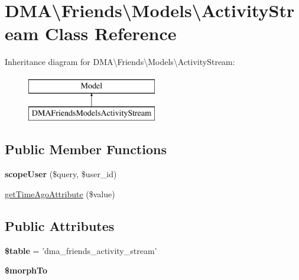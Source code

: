 \hypertarget{classDMA_1_1Friends_1_1Models_1_1ActivityStream}{\section{D\+M\+A\textbackslash{}Friends\textbackslash{}Models\textbackslash{}Activity\+Stream Class Reference}
\label{classDMA_1_1Friends_1_1Models_1_1ActivityStream}
}
Inheritance diagram for D\+M\+A\textbackslash{}Friends\textbackslash{}Models\textbackslash{}Activity\+Stream\+:\begin{figure}[H]
\begin{center}
\leavevmode
\includegraphics[height=2.000000cm]{dc/dae/classDMA_1_1Friends_1_1Models_1_1ActivityStream}
\end{center}
\end{figure}
\subsection*{Public Member Functions}
\begin{DoxyCompactItemize}
\item 
\hypertarget{classDMA_1_1Friends_1_1Models_1_1ActivityStream_ae26f2bdc09d56a8175288479289033d1}{{\bfseries scope\+User} (\$query, \$user\+\_\+id)}\label{classDMA_1_1Friends_1_1Models_1_1ActivityStream_ae26f2bdc09d56a8175288479289033d1}

\item 
\hyperlink{classDMA_1_1Friends_1_1Models_1_1ActivityStream_af1ea76e78f467dbe95233d8a0d2f386b}{get\+Time\+Ago\+Attribute} (\$value)
\end{DoxyCompactItemize}
\subsection*{Public Attributes}
\begin{DoxyCompactItemize}
\item 
\hypertarget{classDMA_1_1Friends_1_1Models_1_1ActivityStream_acc9fdaa6e30c75159bd96d96f6ca5da2}{{\bfseries \$table} = 'dma\+\_\+friends\+\_\+activity\+\_\+stream'}\label{classDMA_1_1Friends_1_1Models_1_1ActivityStream_acc9fdaa6e30c75159bd96d96f6ca5da2}

\item 
{\bfseries \$morph\+To}
\end{DoxyCompactItemize}
